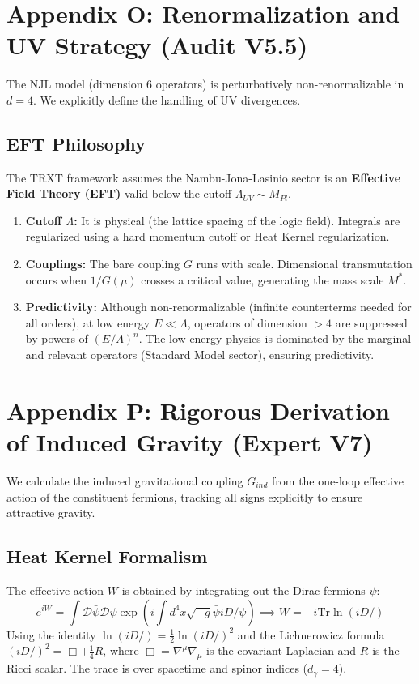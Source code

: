 \documentclass[a4paper,12pt]{article}
\newcommand{\slashed}[1]{\ensuremath{#1\!\!\!/}}
\begin{document}
\section{Appendix O: Renormalization and UV Strategy (Audit V5.5)}

The NJL model (dimension 6 operators) is perturbatively non-renormalizable in $d=4$. We explicitly define the handling of UV divergences.

\subsection{EFT Philosophy}
The TRXT framework assumes the Nambu-Jona-Lasinio sector is an \textbf{Effective Field Theory (EFT)} valid below the cutoff $\Lambda_{UV} \sim M_{Pl}$.
\begin{enumerate}
    \item \textbf{Cutoff $\Lambda$:} It is physical (the lattice spacing of the logic field). Integrals are regularized using a hard momentum cutoff or Heat Kernel regularization.
    \item \textbf{Couplings:} The bare coupling $G$ runs with scale. Dimensional transmutation occurs when $1/G(\mu)$ crosses a critical value, generating the mass scale $M^*$.
    \item \textbf{Predictivity:} Although non-renormalizable (infinite counterterms needed for all orders), at low energy $E \ll \Lambda$, operators of dimension $>4$ are suppressed by powers of $(E/\Lambda)^n$. The low-energy physics is dominated by the marginal and relevant operators (Standard Model sector), ensuring predictivity.
\end{enumerate}

\section{Appendix P: Rigorous Derivation of Induced Gravity (Expert V7)}

We calculate the induced gravitational coupling $G_{ind}$ from the one-loop effective action of the constituent fermions, tracking all signs explicitly to ensure attractive gravity.

\subsection{Heat Kernel Formalism}
The effective action $W$ is obtained by integrating out the Dirac fermions $\psi$:
\begin{equation}
    e^{iW} = \int \mathcal{D}\bar{\psi}\mathcal{D}\psi \exp\left( i \int d^4x \sqrt{-g} \bar{\psi} i \slashed{D} \psi \right) \implies W = -i \text{Tr} \ln (i\slashed{D})
\end{equation}
Using the identity $\ln (i\slashed{D}) = \frac{1}{2} \ln (i\slashed{D})^2$ and the Lichnerowicz formula $(i\slashed{D})^2 = \Box + \frac{1}{4}R$, where $\Box = \nabla^\mu \nabla_\mu$ is the covariant Laplacian and $R$ is the Ricci scalar. The trace is over spacetime and spinor indices ($d_\gamma = 4$).
\end{document}
